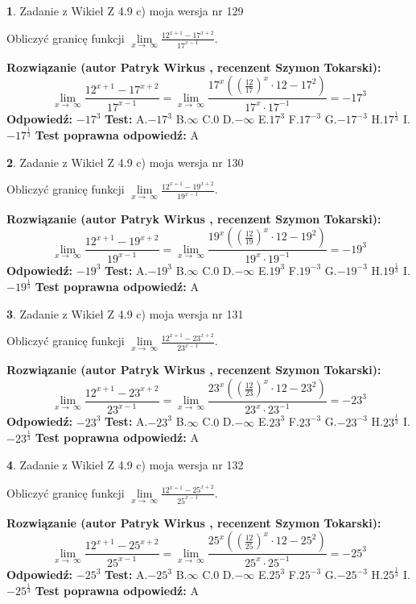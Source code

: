 \documentclass[12pt, a4paper]{article}
\theoremstyle{definition} %
\newtheorem{zad}{}
\newcommand{\zadStart}[1]{\begin{zad}#1\newline}
\newcommand{\zadStop}{\end{zad}}
\newcommand{\rozwStart}[2]{\noindent \textbf{Rozwiązanie (autor #1 , recenzent #2): }\newline}
\newcommand{\rozwStop}{\newline}
\newcommand{\odpStart}{\noindent \textbf{Odpowiedź:}\newline}
\newcommand{\odpStop}{\newline}
\newcommand{\testStart}{\noindent \textbf{Test:}\newline}
\newcommand{\testStop}{\newline}
\newcommand{\kluczStart}{\noindent \textbf{Test poprawna odpowiedź:}\newline}
\newcommand{\kluczStop}{\newline}
\begin{document}
\zadStart{Zadanie z Wikieł Z 4.9 c) moja wersja nr 129}


Obliczyć granicę funkcji  $\lim\limits_{x\to\ \infty}\frac{12^{x+1}-17^{x+2}}{17^{x-1}}$.
\zadStop
\rozwStart{Patryk Wirkus}{Szymon Tokarski}
$$\lim\limits_{x\to\ \infty}\frac{12^{x+1}-17^{x+2}}{17^{x-1}}=\lim\limits_{x\to\ \infty}\frac{17^{x}((\frac{12}{17})^{x}\cdot 12 -17^{2})}{17^{x}\cdot 17^{-1}} = -17^{3}$$
\rozwStop
\odpStart
$-17^{3}$
\odpStop
\testStart
A.$-17^{3}$ B.$\infty$ C.$0$ D.$-\infty$ E.$17^{3}$
F.$17^{-3}$ G.$-17^{-3}$
H.$17^{\frac{1}{3}}$
I.$-17^{\frac{1}{3}}$
\testStop
\kluczStart
A
\kluczStop



\zadStart{Zadanie z Wikieł Z 4.9 c) moja wersja nr 130}


Obliczyć granicę funkcji  $\lim\limits_{x\to\ \infty}\frac{12^{x+1}-19^{x+2}}{19^{x-1}}$.
\zadStop
\rozwStart{Patryk Wirkus}{Szymon Tokarski}
$$\lim\limits_{x\to\ \infty}\frac{12^{x+1}-19^{x+2}}{19^{x-1}}=\lim\limits_{x\to\ \infty}\frac{19^{x}((\frac{12}{19})^{x}\cdot 12 -19^{2})}{19^{x}\cdot 19^{-1}} = -19^{3}$$
\rozwStop
\odpStart
$-19^{3}$
\odpStop
\testStart
A.$-19^{3}$ B.$\infty$ C.$0$ D.$-\infty$ E.$19^{3}$
F.$19^{-3}$ G.$-19^{-3}$
H.$19^{\frac{1}{3}}$
I.$-19^{\frac{1}{3}}$
\testStop
\kluczStart
A
\kluczStop



\zadStart{Zadanie z Wikieł Z 4.9 c) moja wersja nr 131}


Obliczyć granicę funkcji  $\lim\limits_{x\to\ \infty}\frac{12^{x+1}-23^{x+2}}{23^{x-1}}$.
\zadStop
\rozwStart{Patryk Wirkus}{Szymon Tokarski}
$$\lim\limits_{x\to\ \infty}\frac{12^{x+1}-23^{x+2}}{23^{x-1}}=\lim\limits_{x\to\ \infty}\frac{23^{x}((\frac{12}{23})^{x}\cdot 12 -23^{2})}{23^{x}\cdot 23^{-1}} = -23^{3}$$
\rozwStop
\odpStart
$-23^{3}$
\odpStop
\testStart
A.$-23^{3}$ B.$\infty$ C.$0$ D.$-\infty$ E.$23^{3}$
F.$23^{-3}$ G.$-23^{-3}$
H.$23^{\frac{1}{3}}$
I.$-23^{\frac{1}{3}}$
\testStop
\kluczStart
A
\kluczStop



\zadStart{Zadanie z Wikieł Z 4.9 c) moja wersja nr 132}


Obliczyć granicę funkcji  $\lim\limits_{x\to\ \infty}\frac{12^{x+1}-25^{x+2}}{25^{x-1}}$.
\zadStop
\rozwStart{Patryk Wirkus}{Szymon Tokarski}
$$\lim\limits_{x\to\ \infty}\frac{12^{x+1}-25^{x+2}}{25^{x-1}}=\lim\limits_{x\to\ \infty}\frac{25^{x}((\frac{12}{25})^{x}\cdot 12 -25^{2})}{25^{x}\cdot 25^{-1}} = -25^{3}$$
\rozwStop
\odpStart
$-25^{3}$
\odpStop
\testStart
A.$-25^{3}$ B.$\infty$ C.$0$ D.$-\infty$ E.$25^{3}$
F.$25^{-3}$ G.$-25^{-3}$
H.$25^{\frac{1}{3}}$
I.$-25^{\frac{1}{3}}$
\testStop
\kluczStart
A
\kluczStop
\end{document}
